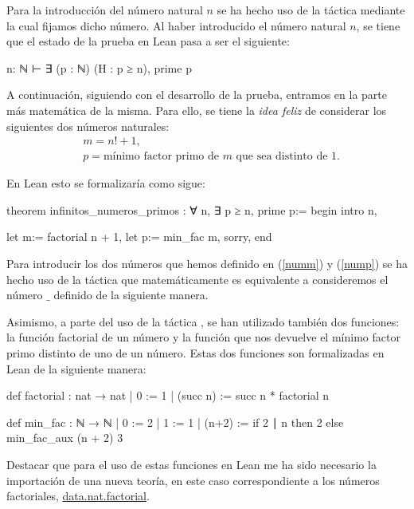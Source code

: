 Para la introducción del número natural \(n\) se ha hecho uso de la táctica
 mediante la cual fijamos dicho número. Al haber
introducido el número natural \(n\), se tiene que el estado de la prueba en
Lean pasa a ser el siguiente:
\begin{leancode}
n: ℕ
⊢ ∃ (p : ℕ) (H : p ≥ n), prime p
\end{leancode}

A continuación, siguiendo con el desarrollo de la prueba, entramos en la parte
más matemática de la misma. Para ello, se tiene la \textit{idea feliz} de
considerar los siguientes dos números naturales:
\begin{align}
  &m=n!+1,\label{numm}\\
  &p=\text{mínimo factor primo de \(m\) que sea distinto de 1}.\label{nump}
\end{align}

En Lean esto se formalizaría como sigue:
\begin{leancode}
theorem infinitos_numeros_primos : ∀ n, ∃ p ≥ n, prime p:=
begin
  intro n,

  let m:= factorial n + 1,
  let p:= min_fac m,
  sorry,
end
\end{leancode}

Para introducir los dos números que hemos definido en (\ref{numm}) y
(\ref{nump}) se ha hecho uso de la táctica  que
matemáticamente es equivalente a consideremos el número \(\_\) definido de la
siguiente manera.

Asimismo, a parte del uso de la táctica , se han utilizado
también dos funciones: la función factorial de un número y la función que nos
devuelve el mínimo factor primo distinto de uno de un número. Estas dos
funciones son formalizadas en Lean de la siguiente manera:
\begin{leancode}
def factorial : nat → nat
| 0        := 1
| (succ n) := succ n * factorial n
\end{leancode}
\begin{leancode}
def min_fac : ℕ → ℕ
  | 0 := 2
  | 1 := 1
  | (n+2) := if 2 ∣ n then 2 else min_fac_aux (n + 2) 3
\end{leancode}

Destacar que para el uso de estas funciones en Lean me ha sido necesario la
importación de una nueva teoría, en este caso correspondiente a los números
factoriales, \href{https://github.com/leanprover-community/mathlib/blob/master/src/data/nat/factorial.lean}{data.nat.factorial}.

